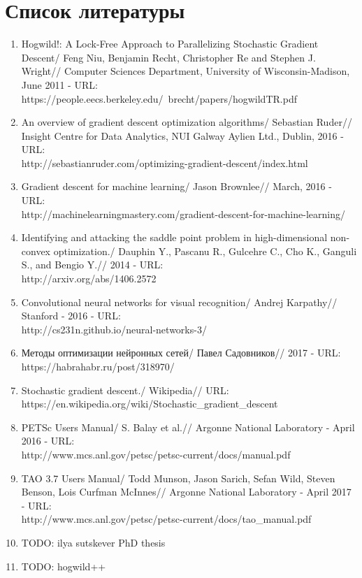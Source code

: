 \documentclass[12pt]{report}
\begin{document}
  \chapter*{Список литературы}
  \begin{enumerate}
    \item
    Hogwild!: A Lock-Free Approach to Parallelizing Stochastic Gradient Descent/
    Feng Niu, Benjamin Recht, Christopher Re and Stephen J. Wright//
    Computer Sciences Department, University of Wisconsin-Madison, June 2011 - URL:\\
    https://people.eecs.berkeley.edu/~brecht/papers/hogwildTR.pdf
    \item
    An overview of gradient descent optimization algorithms/
    Sebastian Ruder//
    Insight Centre for Data Analytics, NUI Galway Aylien Ltd., Dublin, 2016 - URL:\\
    http://sebastianruder.com/optimizing-gradient-descent/index.html
    \item
    Gradient descent for machine learning/
    Jason Brownlee//
    March, 2016 - URL:\\
    http://machinelearningmastery.com/gradient-descent-for-machine-learning/
    \item
    Identifying and attacking the saddle point problem in high-dimensional
    non-convex optimization./
    Dauphin Y., Pascanu R., Gulcehre C., Cho K., Ganguli S., and Bengio Y.//
    2014 - URL:\\
    http://arxiv.org/abs/1406.2572
    \item
    Convolutional neural networks for visual recognition/
    Andrej Karpathy//
    Stanford - 2016 - URL:\\
    http://cs231n.github.io/neural-networks-3/
    \item
    Методы оптимизации нейронных сетей/
    Павел Садовников//
    2017 - URL:\\
    https://habrahabr.ru/post/318970/
    \item
    Stochastic gradient descent./
    Wikipedia//
    URL:\\
    https://en.wikipedia.org/wiki/Stochastic\_gradient\_descent
    \item
    PETSc Users Manual/
    S. Balay et al.//
    Argonne National Laboratory - April 2016 - URL:\\
    http://www.mcs.anl.gov/petsc/petsc-current/docs/manual.pdf
    \item
    TAO 3.7 Users Manual/
    Todd Munson, Jason Sarich, Sefan Wild, Steven Benson, Lois Curfman McInnes//
    Argonne National Laboratory - April 2017 - URL:\\
    http://www.mcs.anl.gov/petsc/petsc-current/docs/tao\_manual.pdf
    \item
    {TODO: ilya sutskever PhD thesis}
    \item
    {TODO: hogwild++}
  \end{enumerate}
\end{document}
